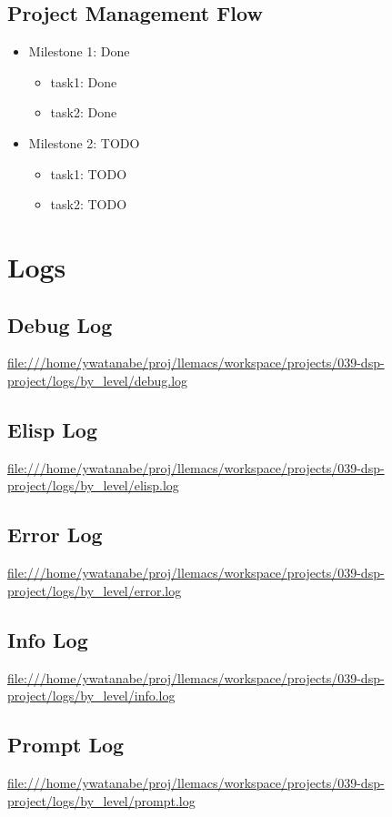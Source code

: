 \documentclass[11pt]{article}
\begin{document}
\subsection{Project Management Flow}
\label{sec:org3008ab4}
\begin{itemize}
\item Milestone 1: Done
\begin{itemize}
\item task1: Done
\item task2: Done
\end{itemize}
\item Milestone 2: TODO
\begin{itemize}
\item task1: TODO
\item task2: TODO
\end{itemize}
\end{itemize}

\section{Logs}
\label{sec:org0978a2a}
\subsection{Debug Log}
\label{sec:org71f983a}
\url{file:///home/ywatanabe/proj/llemacs/workspace/projects/039-dsp-project/logs/by\_level/debug.log}

\subsection{Elisp Log}
\label{sec:orgc3bab3d}
\url{file:///home/ywatanabe/proj/llemacs/workspace/projects/039-dsp-project/logs/by\_level/elisp.log}

\subsection{Error Log}
\label{sec:org373ac45}
\url{file:///home/ywatanabe/proj/llemacs/workspace/projects/039-dsp-project/logs/by\_level/error.log}

\subsection{Info Log}
\label{sec:orgee0dbd8}
\url{file:///home/ywatanabe/proj/llemacs/workspace/projects/039-dsp-project/logs/by\_level/info.log}

\subsection{Prompt Log}
\label{sec:orgdfb8c60}
\url{file:///home/ywatanabe/proj/llemacs/workspace/projects/039-dsp-project/logs/by\_level/prompt.log}
\end{document}
